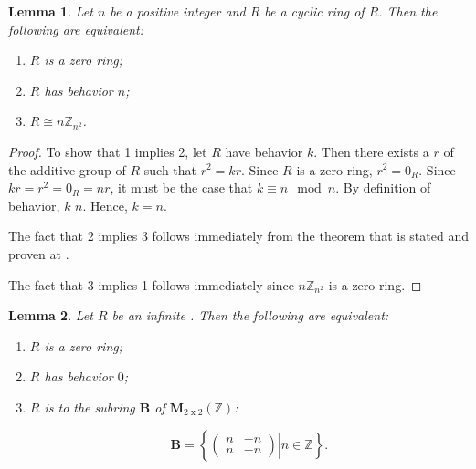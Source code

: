 \documentclass[12pt]{article}
\newtheorem{lemma}{Lemma}
\begin{document}

\begin{lemma}
Let $n$ be a positive integer and $R$ be a cyclic ring of  $R$.  Then the following are equivalent:

\begin{enumerate}
\item $R$ is a zero ring;
\item $R$ has behavior $n$;
\item $R \cong n\mathbb{Z}_{n^2}$.
\end{enumerate}
\end{lemma}

\begin{proof}
To show that 1 implies 2, let $R$ have behavior $k$.  Then there exists a  $r$ of the additive group of $R$ such that $r^2=kr$.  Since $R$ is a zero ring, $r^2=0_R$.  Since $kr=r^2=0_R=nr$, it must be the case that $k \equiv n \mod n$.  By definition of behavior, $k$  $n$.  Hence, $k=n$.

The fact that 2 implies 3 follows immediately from the theorem that is stated and proven at .

The fact that 3 implies 1 follows immediately since $n\mathbb{Z}_{n^2}$ is a zero ring.
\end{proof}

\begin{lemma}
Let $R$ be an infinite .  Then the following are equivalent:

\begin{enumerate}
\item $R$ is a zero ring;
\item $R$ has behavior $0$;
\item $R$ is  to the subring $\mathbf{B}$ of $\mathbf{M}_{2\operatorname{x}2}(\mathbb{Z})$:

$$\mathbf{B}=\left\{ \left. \left( \begin{array}{cc}
n & -n \\
n & -n \end{array} \right) \right\vert n \in \mathbb{Z} \right\}.$$
\end{enumerate}
\end{lemma}
\end{document}
